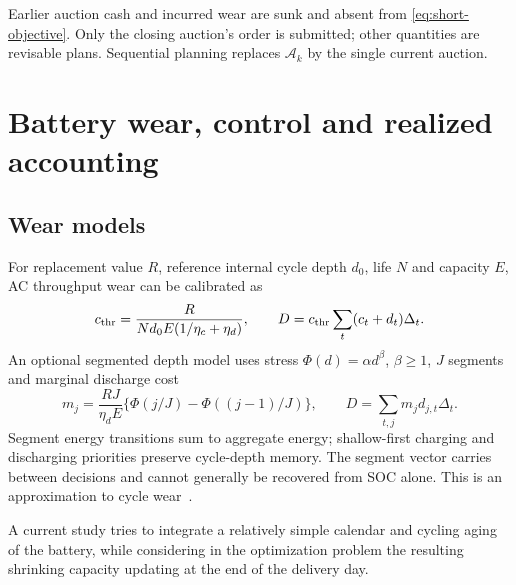 \documentclass[11pt,a4paper]{article}
\begin{document}
Earlier auction cash and incurred wear are sunk and absent from
\eqref{eq:short-objective}. Only the closing auction's order is submitted;
other quantities are revisable plans. Sequential planning replaces
$\mathcal A_k$ by the single current auction.




\section{Battery wear, control and realized accounting}
\subsection{Wear models}
For replacement value $R$, reference internal cycle depth $d_0$, life $N$ and
capacity $E$, AC throughput wear can be calibrated as
\begin{equation}
 c_{\rm thr}=\frac{R}{Nd_0E(1/\eta_c+\eta_d)},\qquad
 D=c_{\rm thr}\sum_t(c_t+d_t)\Delta_t.
\end{equation}
An optional segmented depth model uses stress $\Phi(d)=\alpha d^\beta$,
$\beta\ge1$, $J$ segments and marginal discharge cost
\begin{equation}
 m_j=\frac{RJ}{\eta_dE}\{\Phi(j/J)-\Phi((j-1)/J)\},
 \qquad D=\sum_{t,j}m_jd_{j,t}\Delta_t.
\end{equation}
Segment energy transitions sum to aggregate energy; shallow-first charging and
discharging priorities preserve cycle-depth memory. The segment vector carries
between decisions and cannot generally be recovered from SOC alone. This is
an approximation to cycle wear~\cite{xu}.


A current study tries to integrate a relatively simple calendar and cycling
 aging of the battery, while considering in the optimization problem the 
 resulting shrinking capacity updating at the end of the delivery day. 
\end{document}
